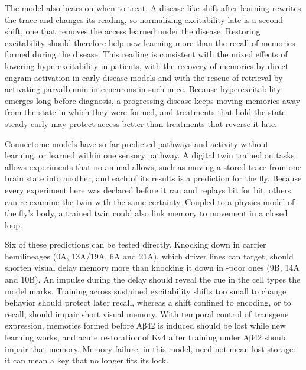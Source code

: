 The model also bears on when to treat. A disease-like shift after learning rewrites the trace and changes its reading, so
normalizing excitability late is a second shift, one that removes the access learned under the disease. Restoring excitability
should therefore help new learning more than the recall of memories formed during the disease. This reading is consistent with
the mixed effects of lowering hyperexcitability in patients, with the recovery of
memories by direct engram activation in early disease models and with the rescue of retrieval by activating
parvalbumin interneurons in such mice. Because hyperexcitability emerges long before
diagnosis, a progressing disease keeps moving memories away from the state in which they were
formed, and treatments that hold the state steady early may protect access better than treatments that reverse it late.

Connectome models have so far predicted pathways and activity without learning, or learned within one sensory
pathway. A digital twin trained on tasks allows experiments that no animal allows, such as
moving a stored trace from one brain state into another, and each of its results is a prediction for the fly. Because every
experiment here was declared before it ran and replays bit for bit, others can re-examine the twin with the same certainty.
Coupled to a physics model of the fly's body, a trained twin could also link memory to movement in a
closed loop.

Six of these predictions can be tested directly. Knocking down  in carrier hemilineages (0A, 13A/19A, 6A and 21A),
which driver lines can target, should shorten visual delay memory more than knocking it down in
-poor ones (9B, 14A and 10B). An impulse during the delay should reveal the cue in the cell types the model
marks. Training across sustained excitability shifts too small to change behavior should protect later
recall, whereas a shift confined to encoding, or to recall, should impair short visual memory. With temporal control of
transgene expression, memories formed before Aβ42 is induced should be lost while new learning
works, and acute restoration of Kv4 after training under Aβ42 should impair that memory. Memory failure, in
this model, need not mean lost storage: it can mean a key that no longer fits its lock.
